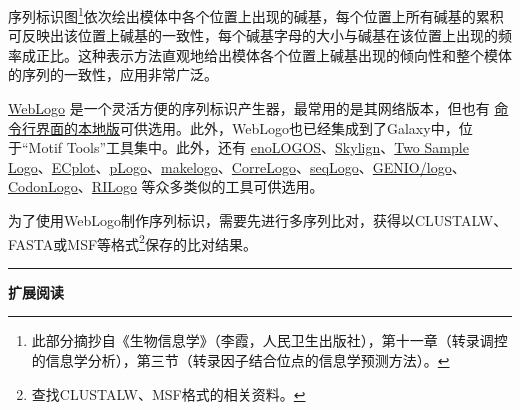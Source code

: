 \documentclass[11pt,a4paper,twoside]{book}
\begin{document}
序列标识图\footnote{此部分摘抄自《生物信息学》（李霞，人民卫生出版社），第十一章（转录调控的信息学分析），第三节（转录因子结合位点的信息学预测方法）。}依次绘出模体中各个位置上出现的碱基，每个位置上所有碱基的累积可反映出该位置上碱基的一致性，每个碱基字母的大小与碱基在该位置上出现的频率成正比。这种表示方法直观地给出模体各个位置上碱基出现的倾向性和整个模体的序列的一致性，应用非常广泛。

\href{http://weblogo.threepluson.com}{WebLogo} 是一个灵活方便的序列标识产生器，最常用的是其网络版本，但也有 \href{http://code.google.com/p/weblogo/}{命令行界面的本地版}可供选用。此外，WebLogo也已经集成到了Galaxy中，位于“Motif Tools”工具集中。此外，还有 \href{http://www.benoslab.pitt.edu/cgi-bin/enologos/enologos.cgi}{enoLOGOS}、\href{http://skylign.org/}{Skylign}、\href{http://www.twosamplelogo.org/}{Two Sample Logo}、\href{https://yiplab.cse.cuhk.edu.hk/ecplot/}{ECplot}、\href{https://plogo.uconn.edu/}{pLogo}、\href{http://schneider.ncifcrf.gov/delila/makelogo.html}{makelogo}、\href{http://www.ccrnp.ncifcrf.gov/users/bshapiro/webserver\_index.html}{CorreLogo}、\href{http://bioconductor.org/packages/release/bioc/html/seqLogo.html}{seqLogo}、\href{http://www.biogenio.com/logo/logo.cgi}{GENIO/logo}、\href{http://recode.ucc.ie/CodonLogo/}{CodonLogo}、\href{http://rth.dk/resources/rilogo/}{RILogo} 等众多类似的工具可供选用。 

为了使用WebLogo制作序列标识，需要先进行多序列比对，获得以CLUSTALW、FASTA或MSF等格式\footnote{查找CLUSTALW、MSF格式的相关资料。}保存的比对结果。
\vspace{0.5cm}
\hrule height 3pt

\noindent
{\large \bfseries \HandPencilLeft 扩展阅读}
\end{document}
